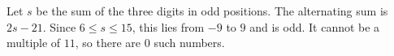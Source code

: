 Let $s$ be the sum of the three digits in odd positions. The alternating sum is $2s-21$. Since $6\le s\le15$, this lies from $-9$ to $9$ and is odd. It cannot be a multiple of $11$, so there are $\boxed0$ such numbers.
